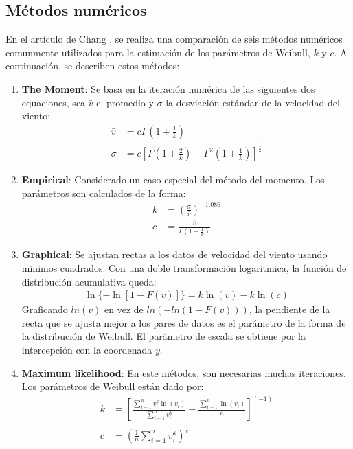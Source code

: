  \subsection{Métodos numéricos}
 En el artículo de Chang \cite{Chang10}, se realiza una comparación de seis métodos numéricos comunmente utilizados para la estimación de los parámetros de Weibull, $k$ y $c$. A continuación, se describen estos métodos:
 \begin{enumerate}
     \item \textbf{The Moment}: Se basa en la iteración numérica de las siguientes dos equaciones, sea $\bar{v}$ el promedio y $\sigma$ la desviación estándar de la velocidad del viento:
        \begin{align}
            \bar{v} &= c\Gamma(1 + \frac{1}{k})\\
            \sigma &= c[\Gamma(1 + \frac{2}{k}) - \Gamma^2(1 + \frac{1}{k})]^{\frac{1}{2}}
        \end{align}    
    \item \textbf{Empirical}: Considerado un caso especial del método del momento. Los parámetros son calculados de la forma: 
        \begin{align}
            k &= (\frac{\sigma}{\bar{v}})^{-1.086}\\
            c &= \frac{\bar{v}}{\Gamma(1 + \frac{1}{k})}
        \end{align}    
    \item \textbf{Graphical}: Se ajustan rectas a los datos de velocidad del viento usando mínimos cuadrados. Con una doble transformación logaritmica, la función de distribución acumulativa queda:
        \begin{align}
            \ln\{-\ln[1- F(v)]\} = k\ln(v) - k\ln(c)
        \end{align}    
         Graficando $ln(v)$ en vez de $ln(-ln(1-F(v)))$, la pendiente de la recta que se ajusta mejor a los pares de datos es el parámetro de la forma de la distribución de Weibull. El parámetro de escala se obtiene por la intercepción con la coordenada $y$.  
    \item \textbf{Maximum likelihood}: En este métodos, son necesarias muchas iteraciones. Los parámetros de Weibull están dado por:
        \begin{align}
            k &= [\frac{\sum_{i=1}^n v_i^k \ln(v_i)}{\sum_{i=1}^n v_i^k} - \frac{\sum_{i=1}^n \ln(v_i)}{n}]^(-1)\\
            c &= (\frac{1}{n}\sum_{i=1}^n v_i^k)^{\frac{1}{k}}
        \end{align}    

\end{enumerate}
